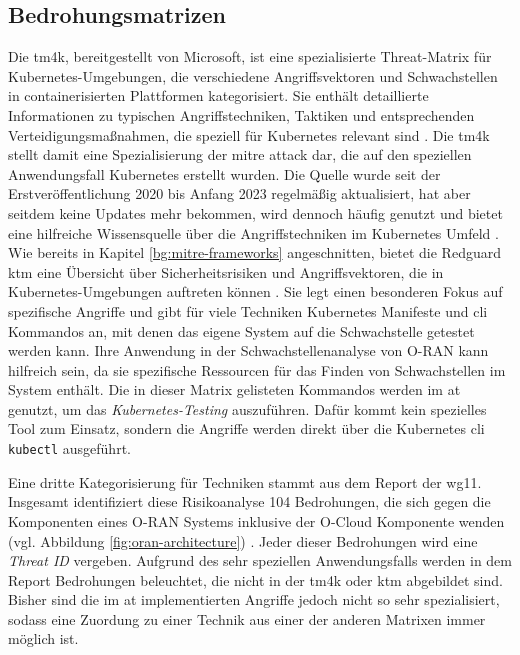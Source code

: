 \subsection{Bedrohungsmatrizen}
\par Die \gls{tm4k}, bereitgestellt von Microsoft, ist eine spezialisierte Threat-Matrix für Kubernetes-Umgebungen, die verschiedene Angriffsvektoren und Schwachstellen in containerisierten Plattformen kategorisiert. Sie enthält detaillierte Informationen zu typischen Angriffstechniken, Taktiken und entsprechenden Verteidigungsmaßnahmen, die speziell für Kubernetes relevant sind \autocite{TacticsThreatMatrix}. Die \gls{tm4k} stellt damit eine Spezialisierung der \gls{mitre} \gls{attack} dar, die auf den speziellen Anwendungsfall Kubernetes erstellt wurden. Die Quelle wurde seit der Erstveröffentlichung 2020 bis Anfang 2023 regelmäßig aktualisiert, hat aber seitdem keine Updates mehr bekommen, wird dennoch häufig genutzt und bietet eine hilfreiche Wissensquelle über die Angriffstechniken im Kubernetes Umfeld \autocite{DeploymentsMicrosoftThreatMatrixforKubernetes}. Wie bereits in Kapitel \ref{bg:mitre-frameworks} angeschnitten, bietet die Redguard \gls{ktm} eine Übersicht über Sicherheitsrisiken und Angriffsvektoren, die in Kubernetes-Umgebungen auftreten können \autocite{KubernetesThreatMatrix}. Sie legt einen besonderen Fokus auf spezifische Angriffe und gibt für viele Techniken Kubernetes Manifeste und \gls{cli} Kommandos an, mit denen das eigene System auf die Schwachstelle getestet werden kann. Ihre Anwendung in der Schwachstellenanalyse von O-RAN kann hilfreich sein, da sie spezifische Ressourcen für das Finden von Schwachstellen im System enthält. Die in dieser Matrix gelisteten Kommandos werden im \gls{at} genutzt, um das \textit{Kubernetes-Testing} auszuführen. Dafür kommt kein spezielles Tool zum Einsatz, sondern die Angriffe werden direkt über die Kubernetes \gls{cli} \verb|kubectl| ausgeführt.
\par Eine dritte Kategorisierung für Techniken stammt aus dem Report der \orana \gls{wg11}. Insgesamt identifiziert diese Risikoanalyse 104 Bedrohungen, die sich gegen die Komponenten eines O-RAN Systems inklusive der O-Cloud Komponente wenden (vgl. Abbildung \ref{fig:oran-architecture}) \autocite{o-ranworkgroup11securityworkgroupORANSecurityThreat2024}. Jeder dieser Bedrohungen wird eine \textit{Threat ID} vergeben. Aufgrund des sehr speziellen Anwendungsfalls werden in dem Report Bedrohungen beleuchtet, die nicht in der \gls{tm4k} oder \gls{ktm} abgebildet sind. Bisher sind die im \gls{at} implementierten Angriffe jedoch nicht so sehr spezialisiert, sodass eine Zuordung zu einer Technik aus einer der anderen Matrixen immer möglich ist.
